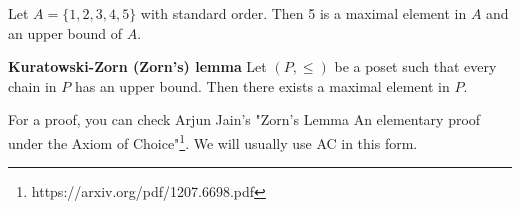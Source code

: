 \begin{example}
  Let $A=\{1,2,3,4,5\}$ with standard order. Then 5 is a maximal element in $A$ and an upper bound of $A$.
\end{example}

\begin{theorem}
  \textbf{Kuratowski-Zorn (Zorn's) lemma}
  Let $(P, \le)$ be a poset such that every chain in $P$ has an upper bound. Then there exists a maximal element in $P$.
\end{theorem}

For a proof, you can check Arjun Jain's "Zorn’s Lemma An elementary proof under the Axiom of Choice"\footnote{https://arxiv.org/pdf/1207.6698.pdf}. We will usually use AC in this form.
